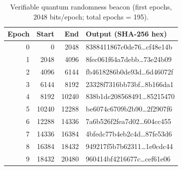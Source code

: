 \begin{table}[t]
\centering
\caption{Verifiable quantum randomness beacon (first epochs, 2048 bits/epoch; total epochs = 195).}
\label{tab:qrng_beacon}
\begin{tabular}{r r r l}
\hline
Epoch & Start & End & Output (SHA-256 hex) \\
\hline
0 & 0 & 2048 & 8388411867c0de76…cf48e14b \\
1 & 2048 & 4096 & 8fec061f64a7debb…73e24b09 \\
2 & 4096 & 6144 & fb4618286b0de93d…6d46072f \\
3 & 6144 & 8192 & 23328f7316bb73bf…8b166da1 \\
4 & 8192 & 10240 & 838b1dc208568491…85215470 \\
5 & 10240 & 12288 & be6074c6709b2b90…2f2907f6 \\
6 & 12288 & 14336 & 7a6b526f2fea7d02…604cc455 \\
7 & 14336 & 16384 & 4bfedc77b4eb2c4d…87fe53d6 \\
8 & 16384 & 18432 & 949217f5b7b62311…1e0cdc44 \\
9 & 18432 & 20480 & 960414bf4216677c…cef61e06 \\
\hline
\end{tabular}
\end{table}